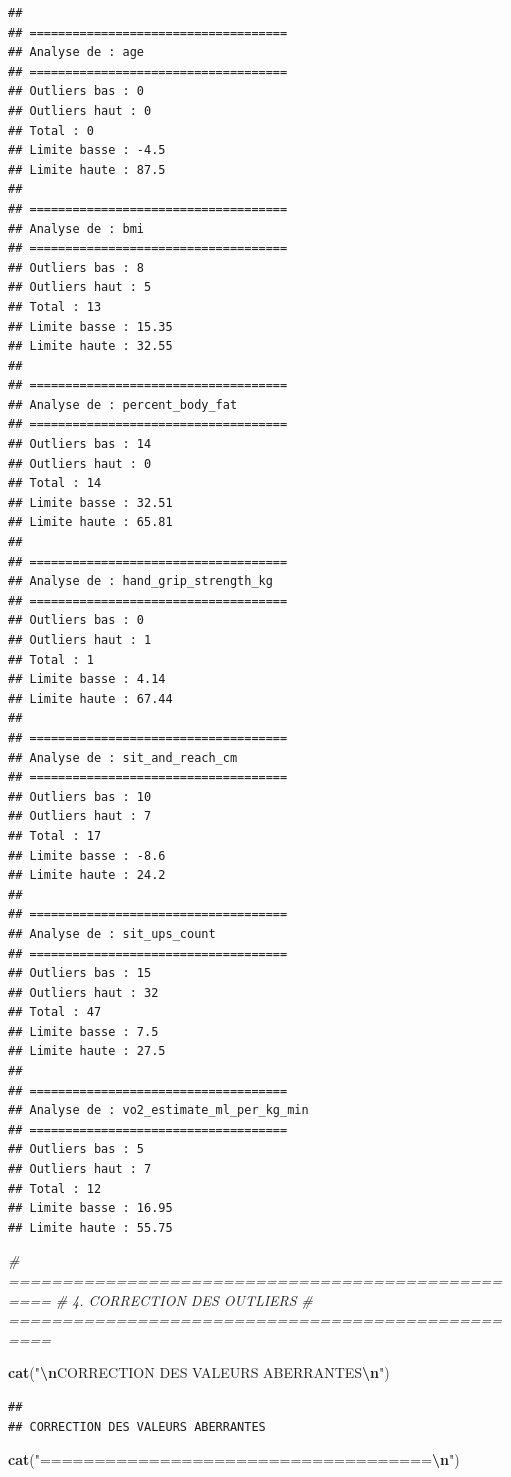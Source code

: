 \documentclass[
]{article}
\newenvironment{Shaded}{\begin{snugshade}}{\end{snugshade}}
\newcommand{\CommentTok}[1]{\textcolor[rgb]{0.56,0.35,0.01}{\textit{#1}}}
\newcommand{\FunctionTok}[1]{\textcolor[rgb]{0.13,0.29,0.53}{\textbf{#1}}}
\newcommand{\NormalTok}[1]{#1}
\newcommand{\SpecialCharTok}[1]{\textcolor[rgb]{0.81,0.36,0.00}{\textbf{#1}}}
\newcommand{\StringTok}[1]{\textcolor[rgb]{0.31,0.60,0.02}{#1}}
\begin{document}
\begin{verbatim}
## 
## ====================================
## Analyse de : age 
## ====================================
## Outliers bas : 0 
## Outliers haut : 0 
## Total : 0 
## Limite basse : -4.5 
## Limite haute : 87.5 
## 
## ====================================
## Analyse de : bmi 
## ====================================
## Outliers bas : 8 
## Outliers haut : 5 
## Total : 13 
## Limite basse : 15.35 
## Limite haute : 32.55 
## 
## ====================================
## Analyse de : percent_body_fat 
## ====================================
## Outliers bas : 14 
## Outliers haut : 0 
## Total : 14 
## Limite basse : 32.51 
## Limite haute : 65.81 
## 
## ====================================
## Analyse de : hand_grip_strength_kg 
## ====================================
## Outliers bas : 0 
## Outliers haut : 1 
## Total : 1 
## Limite basse : 4.14 
## Limite haute : 67.44 
## 
## ====================================
## Analyse de : sit_and_reach_cm 
## ====================================
## Outliers bas : 10 
## Outliers haut : 7 
## Total : 17 
## Limite basse : -8.6 
## Limite haute : 24.2 
## 
## ====================================
## Analyse de : sit_ups_count 
## ====================================
## Outliers bas : 15 
## Outliers haut : 32 
## Total : 47 
## Limite basse : 7.5 
## Limite haute : 27.5 
## 
## ====================================
## Analyse de : vo2_estimate_ml_per_kg_min 
## ====================================
## Outliers bas : 5 
## Outliers haut : 7 
## Total : 12 
## Limite basse : 16.95 
## Limite haute : 55.75
\end{verbatim}

\begin{Shaded}
\begin{Highlighting}[]
\CommentTok{\# ==================================================}
\CommentTok{\# 4. CORRECTION DES OUTLIERS}
\CommentTok{\# ==================================================}

\FunctionTok{cat}\NormalTok{(}\StringTok{"}\SpecialCharTok{\textbackslash{}n}\StringTok{CORRECTION DES VALEURS ABERRANTES}\SpecialCharTok{\textbackslash{}n}\StringTok{"}\NormalTok{)}
\end{Highlighting}
\end{Shaded}

\begin{verbatim}
## 
## CORRECTION DES VALEURS ABERRANTES
\end{verbatim}

\begin{Shaded}
\begin{Highlighting}[]
\FunctionTok{cat}\NormalTok{(}\StringTok{"====================================}\SpecialCharTok{\textbackslash{}n}\StringTok{"}\NormalTok{)}
\end{Highlighting}
\end{Shaded}
\end{document}
